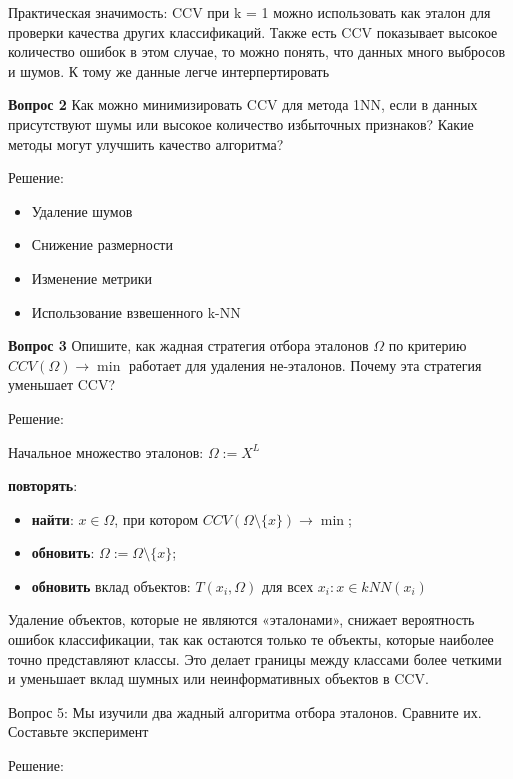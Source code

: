 Практическая значимость: CCV при k = 1 можно использовать как эталон для проверки качества других классификаций. Также есть CCV показывает высокое количество ошибок в этом случае, то можно понять, что данных много выбросов и шумов. К тому же данные легче интерпертировать

\bigskip

\textbf{Вопрос 2}
Как можно минимизировать CCV для метода 1NN, если в данных присутствуют шумы или высокое количество избыточных признаков? Какие методы могут улучшить качество алгоритма?  

Решение:  
\begin{itemize}
    \item Удаление шумов
    \item Снижение размерности
    \item Изменение метрики
    \item Использование взвешенного k-NN
\end{itemize}

\bigskip

\textbf{Вопрос 3 }
Опишите, как жадная стратегия отбора эталонов $\Omega$ по критерию $CCV(\Omega) \to \min$ работает для удаления не-эталонов. Почему эта стратегия уменьшает CCV?  

Решение:

Начальное множество эталонов: $\Omega := X^L$

\textbf{повторять}: 
\begin{itemize}
    \item \textbf{найти}: $x \in \Omega$, при котором $CCV(\Omega \setminus \{x\}) \to \min$;
    \item \textbf{обновить}: $\Omega := \Omega \setminus \{x\}$;
    \item \textbf{обновить} вклад объектов: $T(x_i, \Omega)$ для всех $x_i: x \in kNN(x_i)$
    
\end{itemize}

\bigskip

Удаление объектов, которые не являются «эталонами», снижает вероятность ошибок классификации, так как остаются только те объекты, которые наиболее точно представляют классы. Это делает границы между классами более четкими и уменьшает вклад шумных или неинформативных объектов в CCV.

Вопрос 5:
Мы изучили два жадный алгоритма отбора эталонов. Сравните их. Составьте эксперимент

Решение: \\


